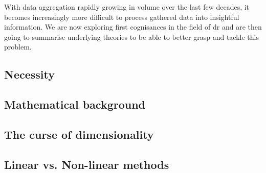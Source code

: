 \vspace{-2mm}
With data aggregation rapidly growing in volume over the last few decades, it becomes increasingly more difficult to process gathered data into insightful information.
We are now exploring first cognisances in the field of \acrlong{dr} and are then going to summarise underlying theories to be able to better grasp and tackle this problem.
\vspace{-6mm}


\subsection{Necessity}
\vspace{-2mm}

\clearpage




\subsection{Mathematical background}

\clearpage


\subsection{The curse of dimensionality} \label{curseOfDimensionality}

\vfill
\clearpage


\subsection{Linear vs. Non-linear methods}

\clearpage
